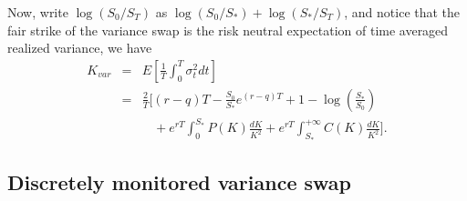\documentclass[12pt]{article}
\begin{document}
    Now, write $\log(S_0/S_T)$ as $\log(S_0/S_*)+\log(S_*/S_T)$, and notice that the fair strike of the variance swap is
    the risk neutral expectation of time averaged realized variance, we have
    \begin{eqnarray}
      K_{var} &=& E\left[\frac{1}{T}\int_0^T\sigma_t^2dt\right]\nonumber\\
              &=& \frac{2}{T}\Bigg[(r-q)T-\frac{S_0}{S_*}e^{(r-q)T}+1-\log\left(\frac{S_*}{S_0}\right)\nonumber\\
              &&\ \ \ \ +e^{rT}\int_0^{S_*}P(K)\frac{dK}{K^2}+e^{rT}\int_{S_*}^{+\infty}C(K)\frac{dK}{K^2}\Bigg].
    \end{eqnarray}


  \subsection{Discretely monitored variance swap}
\end{document}
